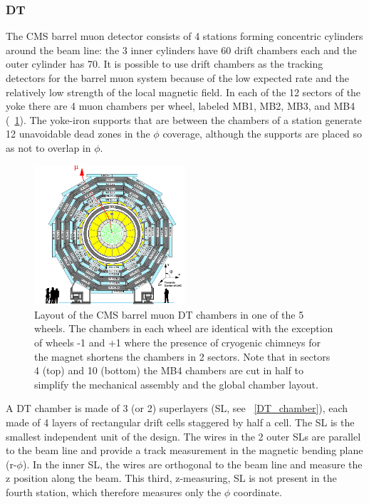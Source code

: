 \subsubsection{DT}
The CMS barrel muon detector consists of 4 stations forming concentric cylinders around the beam line: the 3 inner cylinders have 60 drift chambers each and the outer cylinder has 70. It is possible to use drift chambers as the tracking detectors for the barrel muon system because of the low expected rate and the relatively low strength of the local magnetic field. In each of the 12 sectors of the yoke there are 4 muon chambers per wheel, labeled MB1, MB2, MB3, and MB4 (\figurename~\ref{DT}). The yoke-iron supports that are between the chambers of a station generate 12 unavoidable dead zones in the $\phi$ coverage, although the supports are placed so as not to overlap in $\phi$.
\begin{figure}[h!]
 \centering
 \includegraphics[width=0.5\textwidth]{Images/DT.png}
 \caption{Layout of the CMS barrel muon DT chambers in one of the 5 wheels. The chambers in each wheel are identical with the exception of wheels -1 and +1 where the presence of cryogenic chimneys for the magnet shortens the chambers in 2 sectors. Note that in sectors 4 (top) and 10 (bottom) the MB4 chambers are cut in half to simplify the mechanical assembly and the global chamber layout.}
\label{DT}
\end{figure}
A DT chamber is made of 3 (or 2) superlayers (SL, see \figurename~\ref{DT_chamber}), each made of 4 layers of rectangular drift cells staggered by half a cell. The SL is the smallest independent unit of the design. The wires in the 2 outer SLs are parallel to the beam line and provide a track measurement in the magnetic bending plane (r-$\phi$). In the inner SL, the wires are orthogonal to the beam line and measure the z position along the beam. This third, z-measuring, SL is not present in the fourth station, which therefore measures only the $\phi$ coordinate. 
